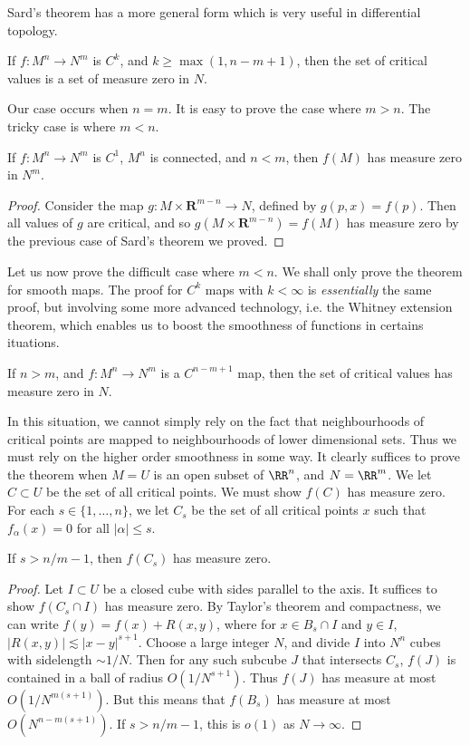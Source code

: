 Sard's theorem has a more general form which is very useful in differential topology.

\begin{theorem}[Sard]
    If $f: M^n \to N^m$ is $C^k$, and $k \geq \max(1,n-m+1)$, then the set of critical values is a set of measure zero in $N$.
\end{theorem}

Our case occurs when $n = m$. It is easy to prove the case where $m > n$. The tricky case is where $m < n$.

\begin{theorem}
    If $f:M^n \to N^m$ is $C^1$, $M^n$ is connected, and $n < m$, then $f(M)$ has measure zero in $N^m$.
\end{theorem}
\begin{proof}
    Consider the map $g: M \times \mathbf{R}^{m-n} \to N$, defined by $g(p,x) = f(p)$. Then all values of $g$ are critical, and so $g(M \times \mathbf{R}^{m-n}) = f(M)$ has measure zero by the previous case of Sard's theorem we proved.
\end{proof}

Let us now prove the difficult case where $m < n$. We shall only prove the theorem for smooth maps. The proof for $C^k$ maps with $k < \infty$ is \emph{essentially} the same proof, but involving some more advanced technology, i.e. the Whitney extension theorem, which enables us to boost the smoothness of functions in certains ituations.

\begin{theorem}
    If $n > m$, and $f: M^n \to N^m$ is a $C^{n-m+1}$ map, then the set of critical values has measure zero in $N$.
\end{theorem}

In this situation, we cannot simply rely on the fact that neighbourhoods of critical points are mapped to neighbourhoods of lower dimensional sets. Thus we must rely on the higher order smoothness in some way. It clearly suffices to prove the theorem when $M = U$ is an open subset of $\RR^n$, and $N = \RR^m$. We let $C \subset U$ be the set of all critical points. We must show $f(C)$ has measure zero. For each $s \in \{ 1, \dots, n \}$, we let $C_s$ be the set of all critical points $x$ such that $f_\alpha(x) = 0$ for all $|\alpha| \leq s$.

\begin{lemma}
    If $s > n/m - 1$, then $f(C_s)$ has measure zero.
\end{lemma}
\begin{proof}
    Let $I \subset U$ be a closed cube with sides parallel to the axis. It suffices to show $f(C_s \cap I)$ has measure zero. By Taylor's theorem and compactness, we can write $f(y) = f(x) + R(x,y)$, where for $x \in B_s \cap I$ and $y \in I$, $|R(x,y)| \lesssim |x - y|^{s+1}$. Choose a large integer $N$, and divide $I$ into $N^n$ cubes with sidelength $\sim 1/N$. Then for any such subcube $J$ that intersects $C_s$, $f(J)$ is contained in a ball of radius $O(1/N^{s+1})$. Thus $f(J)$ has measure at most $O(1/N^{m(s+1)})$. But this means that $f(B_s)$ has measure at most $O(N^{n-m(s+1)})$. If $s > n/m-1$, this is $o(1)$ as $N \to \infty$.
\end{proof}


